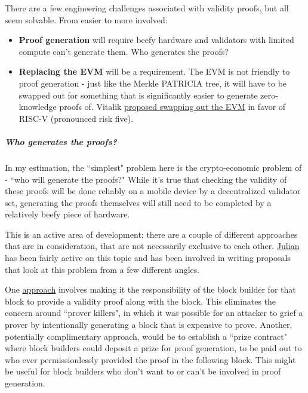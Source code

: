 \documentclass[12pt]{article}
\begin{document}
There are a few engineering challenges associated with validity proofs, but all seem solvable. From easier to more involved: 

\begin{itemize}
    \item \textbf{Proof generation} will require beefy hardware and validators with limited compute can't generate them. Who generates the proofs?
    \item \textbf{Replacing the EVM} will be a requirement. The EVM is not friendly to proof generation - just like the Merkle PATRICIA tree, it will have to be swapped out for something that is significantly easier to generate zero-knowledge proofs of. Vitalik \href{https://ethereum-magicians.org/t/long-term-l1-execution-layer-proposal-replace-the-evm-with-risc-v/23617}{proposed swapping out the EVM} in favor of RISC-V (pronounced risk five). 
\end{itemize}

\subparagraph{Who generates the proofs?}

In my estimation, the ``simplest" problem here is the crypto-economic problem of - ``who will generate the proofs?" While it's true that checking the validity of these proofs will be done reliably on a mobile device by a decentralized validator set, generating the proofs themselves will still need to be completed by a relatively beefy piece of hardware. 

This is an active area of development; there are a couple of different approaches that are in consideration, that are not necessarily exclusive to each other. \href{https://ethresear.ch/u/Julian/summary}{Julian} has been fairly active on this topic and has been involved in writing proposals that look at this problem from a few different angles. 

One \href{https://ethresear.ch/t/prover-killers-killer-you-build-it-you-prove-it/22308}{approach} involves making it the responsibility of the block builder for that block to provide a validity proof along with the block. This eliminates the concern around ``prover killers", in which it was possible for an attacker to grief a prover by intentionally generating a block that is expensive to prove. Another, potentially complimentary approach, would be to establish a ``prize contract" where block builders could deposit a prize for proof generation, to be paid out to who ever permissionlessly provided the proof in the following block. This might be useful for block builders who don't want to or can't be involved in proof generation.  
\end{document}

